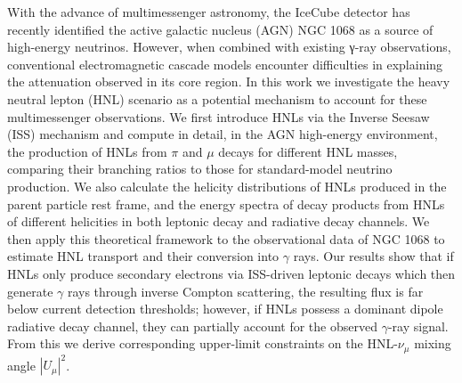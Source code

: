 \documentclass[printMode=false, declarePage=false]{ecnuthesis}
\begin{document}
\tableofcontents

\frontmatter

\begin{abstract}
  随着多信使天文学的发展，IceCube 探测器在近期确认了活动星系核（AGN）NGC 1068 作为高能中微子点源。然而，结合现
  有的 $\gamma$ 射线观测数据，传统的电磁级联模型在解释其核心区域的遮蔽现象时存在一定困难。本文基于重中性轻子（HNL）
  模型，探讨了其作为解释这一多信使观测结果潜在机制的可能性。
  本文首先通过 Inverse Seesaw （ISS）机制引入HNL，详细计算了在AGN高能环境中，不同质量的 HNL 通过$\pi$介子和$\mu$子衰变的产生时，
  相比较于产生标准模型中微子的分支比，以及产生的 HNL 粒子在母粒子静止系下的螺旋度分布、不同螺旋度的 HNL 粒子在轻子衰变与辐射衰变通道中产物的能谱分布。
  随后，将该理论模型应用于 NGC 1068 的实际观测数据中，估算了 HNL 输运并转化
  为$\gamma$射线的过程。研究结果表明，如果HNL仅通过ISS机制的轻子衰变产生次级电子并经逆康普顿散射转化为 $\gamma$ 射线，
  其通量远低于现有探测阈值；但若 HNL 存在占主导的偶极辐射衰变通道，则能够部分解释观测到的 $\gamma$ 射线信号，并由此可
  以对 HNL 与 $\nu_\mu$ 的混合角 $|U_\mu|^2$ 给出相应的参数空间上限限制。
\end{abstract}

\begin{abstractEN}
  With the advance of multimessenger astronomy, the IceCube detector has recently identified the active galactic nucleus
  (AGN) NGC 1068 as a source of high-energy neutrinos. However, when combined with existing γ-ray observations, conventional
  electromagnetic cascade models encounter difficulties in explaining the attenuation observed in its core region. In 
  this work we investigate the heavy neutral lepton (HNL) scenario as a potential mechanism to account for these multimessenger 
  observations.
  We first introduce HNLs via the Inverse Seesaw (ISS) mechanism and compute in detail, in the AGN high-energy environment, the 
  production of HNLs from $\pi$ and $\mu$ decays for different HNL masses, comparing their branching ratios to those for 
  standard-model neutrino production. We also calculate the helicity distributions of HNLs produced in the parent particle 
  rest frame, and the energy spectra of decay products from HNLs of different helicities in both leptonic decay and radiative 
  decay channels. We then apply this theoretical framework to the observational data of NGC 1068 to estimate HNL transport and 
  their conversion into $\gamma$ rays. Our results show that if HNLs only produce secondary electrons via ISS-driven leptonic decays which 
  then generate $\gamma$ rays through inverse Compton scattering, the resulting flux is far below current detection thresholds; 
  however, if HNLs possess a dominant dipole radiative decay channel, they can partially account for the observed $\gamma$-ray signal. 
  From this we derive corresponding upper-limit constraints on the HNL-$\nu_\mu$ mixing angle $|U_\mu|^2$.
\end{abstractEN}
\end{document}
